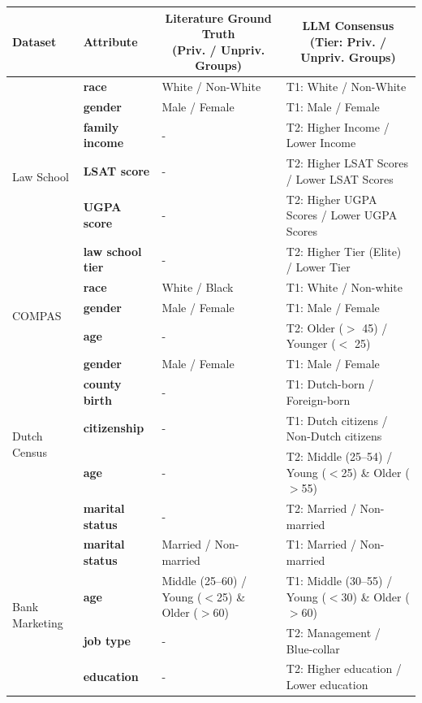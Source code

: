 \begin{table}[htbp]
\centering
\begin{threeparttable}
\small 
\setlength{\tabcolsep}{4pt}
\begin{tabular}{@{}ll p{4cm} p{7cm}@{}}
\toprule
\textbf{Dataset} & \textbf{Attribute} & 
\multicolumn{1}{c}{\parbox{4.5cm}{\centering\textbf{Literature Ground Truth}\\[2pt](Priv. / Unpriv. Groups)}} & 
\multicolumn{1}{c}{\parbox{6.5cm}{\centering\textbf{LLM Consensus}\\[2pt](Tier: Priv. / Unpriv. Groups)}} \\
\midrule

\multirow{6}{*}{Law School\tnote{a}}
 & \textbf{race} & White / Non-White & T1:  White / Non-White \\
  & \textbf{gender} & Male / Female & T1: Male / Female \\
 & \textbf{family income} & - & T2: Higher Income / Lower Income \\
 & \textbf{LSAT score} & - & T2: Higher LSAT Scores / Lower LSAT Scores \\
 & \textbf{UGPA score} & - & T2: Higher UGPA Scores / Lower UGPA Scores \\
 & \textbf{law school tier} & - & T2: Higher Tier (Elite) / Lower Tier \\
\midrule
\multirow{3}{*}{COMPAS\tnote{b} }
 & \textbf{race} & White / Black & T1: White / Non-white \\
 & \textbf{gender} & Male / Female & T1: Male / Female \\
& \textbf{age} & - & T2: Older ($>$ 45) / Younger ($<$ 25)\\
\midrule
\multirow{5}{*}{Dutch Census\tnote{c}}
 & \textbf{gender} & Male / Female & T1: Male / Female \\
 & \textbf{county birth} & - & T1: Dutch-born / Foreign-born\\
 & \textbf{citizenship} & - & T1: Dutch citizens / Non-Dutch citizens \\
 & \textbf{age} & - & T2: Middle (25--54) / Young ($<$25) \& Older ($>$55) \\
 & \textbf{marital status} & - & T2: Married / Non-married \\
\midrule
\multirow{4}{*}{Bank Marketing\tnote{d}}
 & \textbf{marital status} & Married / Non-married & T1: Married / Non-married \\
 & \textbf{age} & Middle (25--60) / Young ($<$25) \& Older ($>$60) & T1: Middle (30--55) / Young ($<$30) \& Older ($>$60) \\
& \textbf{job type} & - & T2: Management / Blue-collar \\
& \textbf{education} & - & T2: Higher education / Lower education\\
\bottomrule
\end{tabular}


\end{threeparttable}
\end{table}
